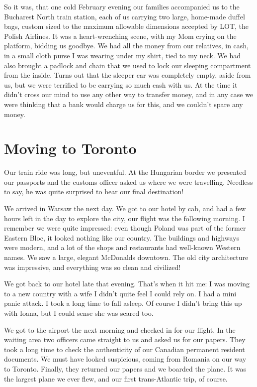 \documentclass[12pt]{book}
\begin{document}
So it was, that one cold February evening our families accompanied us to
the Bucharest North train station, each of us carrying two large,
home-made duffel bags, custom sized to the maximum allowable dimensions
accepted by LOT, the Polish Airlines. It was a heart-wrenching scene,
with my Mom crying on the platform, bidding us goodbye. We had all the
money from our relatives, in cash, in a small cloth purse I was wearing
under my shirt, tied to my neck. We had also brought a padlock and chain
that we used to lock our sleeping compartment from the inside. Turns out
that the sleeper car was completely empty, aside from us, but we were
terrified to be carrying so much cash with us. At the time it didn't
cross our mind to use any other way to transfer money, and in any case
we were thinking that a bank would charge us for this, and we couldn't
spare any money.


\section{Moving to Toronto}

Our train ride was long, but uneventful. At the Hungarian border we
presented our passports and the customs officer asked us where we were
travelling. Needless to say, he was quite surprised to hear our final
destination!

We arrived in Warsaw the next day. We got to our hotel by cab, and had a
few hours left in the day to explore the city, our flight was the
following morning. I remember we were quite impressed: even though
Poland was part of the former Eastern Bloc, it looked nothing like our
country. The buildings and highways were modern, and a lot of the shops
and restaurants had well-known Western names. We saw a large, elegant
McDonalds downtown. The old city architecture was impressive, and
everything was so clean and civilized!

We got back to our hotel late that evening. That's when it hit me: I was
moving to a new country with a wife I didn't quite feel I could rely on.
I had a mini panic attack. I took a long time to fall asleep. Of course
I didn't bring this up with Ioana, but I could sense she was scared too.

We got to the airport the next morning and checked in for our flight. In
the waiting area two officers came straight to us and asked us for our
papers. They took a long time to check the authenticity of our Canadian
permanent resident documents. We must have looked suspicious, coming
from Romania on our way to Toronto. Finally, they returned our papers
and we boarded the plane. It was the largest plane we ever flew, and our
first trans-Atlantic trip, of course.
\end{document}
